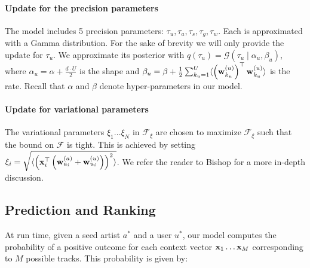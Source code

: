 \paragraph{Update for the precision parameters}
\noindent The model includes 5 precision parameters: $\tau_u, \tau_a, \tau_s, \tau_g, \tau_w$. Each is approximated with a Gamma distribution. For the sake of brevity we will only provide the update for $\tau_u$. We approximate its posterior with $q(\tau_u)= \mathcal{G}(\tau_u\mid \alpha_u, \beta_u)$, where $\alpha_u=\alpha+\frac{d \cdot U}{2}$ is the shape and $\beta_u=\beta+\frac{1}{2}\sum_{k_u=1}^U\langle \left(\mathbf{w}^{(u)}_{k_u}\right)^{\top} \mathbf{w}^{(u)}_{k_u}\rangle$ is the rate.
Recall that $\alpha$ and $\beta$ denote hyper-parameters in our model.  


\paragraph{Update for variational parameters}
\noindent The variational parameters $\xi_1\dots \xi_N$ in $\mathcal{F}_{\xi}$ are chosen to maximize $\mathcal{F}_{\xi}$ such that the bound on $\mathcal{F}$ is tight. This is achieved by setting 
$\xi_i= \sqrt{ \langle  \left(\mathbf{x}_i^\top \left( \mathbf{w}^{(a)}_{a_i}+\mathbf{w}^{(u)}_{u_i} \right) \right)^2 \rangle}$. We refer the reader to Bishop \cite{Bishop} for a more in-depth discussion.

\subsection{Prediction and Ranking}
At run time, given a seed artist $a^*$ and a user $u^*$, our model  computes the probability of a positive outcome for each context vector $\mathbf{x}_1 \dots \mathbf{x}_M$ corresponding to $M$ possible tracks. This probability is given by:

